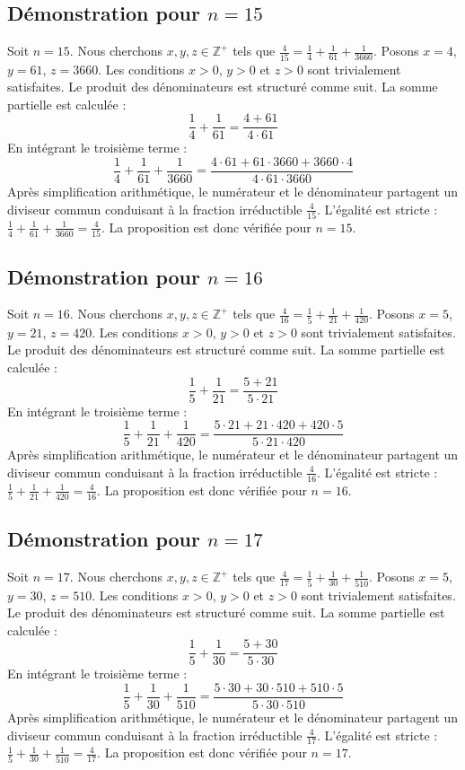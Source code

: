 \documentclass[11pt,a4paper]{article}
\begin{document}
\subsection{Démonstration pour $n = 15$}
Soit $n = 15$. Nous cherchons $x, y, z \in \mathbb{Z}^{+}$ tels que $\frac{4}{15} = \frac{1}{4} + \frac{1}{61} + \frac{1}{3660}$.
Posons $x = 4$, $y = 61$, $z = 3660$.
Les conditions $x > 0$, $y > 0$ et $z > 0$ sont trivialement satisfaites.
Le produit des dénominateurs est structuré comme suit. La somme partielle est calculée :
$$ \frac{1}{4} + \frac{1}{61} = \frac{4+61}{4 \cdot 61} $$
En intégrant le troisième terme :
$$ \frac{1}{4} + \frac{1}{61} + \frac{1}{3660} = \frac{4 \cdot 61 + 61 \cdot 3660 + 3660 \cdot 4}{4 \cdot 61 \cdot 3660} $$
Après simplification arithmétique, le numérateur et le dénominateur partagent un diviseur commun conduisant à la fraction irréductible $\frac{4}{15}$.
L'égalité est stricte : $\frac{1}{4} + \frac{1}{61} + \frac{1}{3660} = \frac{4}{15}$.
La proposition est donc vérifiée pour $n = 15$.
\subsection{Démonstration pour $n = 16$}
Soit $n = 16$. Nous cherchons $x, y, z \in \mathbb{Z}^{+}$ tels que $\frac{4}{16} = \frac{1}{5} + \frac{1}{21} + \frac{1}{420}$.
Posons $x = 5$, $y = 21$, $z = 420$.
Les conditions $x > 0$, $y > 0$ et $z > 0$ sont trivialement satisfaites.
Le produit des dénominateurs est structuré comme suit. La somme partielle est calculée :
$$ \frac{1}{5} + \frac{1}{21} = \frac{5+21}{5 \cdot 21} $$
En intégrant le troisième terme :
$$ \frac{1}{5} + \frac{1}{21} + \frac{1}{420} = \frac{5 \cdot 21 + 21 \cdot 420 + 420 \cdot 5}{5 \cdot 21 \cdot 420} $$
Après simplification arithmétique, le numérateur et le dénominateur partagent un diviseur commun conduisant à la fraction irréductible $\frac{4}{16}$.
L'égalité est stricte : $\frac{1}{5} + \frac{1}{21} + \frac{1}{420} = \frac{4}{16}$.
La proposition est donc vérifiée pour $n = 16$.
\subsection{Démonstration pour $n = 17$}
Soit $n = 17$. Nous cherchons $x, y, z \in \mathbb{Z}^{+}$ tels que $\frac{4}{17} = \frac{1}{5} + \frac{1}{30} + \frac{1}{510}$.
Posons $x = 5$, $y = 30$, $z = 510$.
Les conditions $x > 0$, $y > 0$ et $z > 0$ sont trivialement satisfaites.
Le produit des dénominateurs est structuré comme suit. La somme partielle est calculée :
$$ \frac{1}{5} + \frac{1}{30} = \frac{5+30}{5 \cdot 30} $$
En intégrant le troisième terme :
$$ \frac{1}{5} + \frac{1}{30} + \frac{1}{510} = \frac{5 \cdot 30 + 30 \cdot 510 + 510 \cdot 5}{5 \cdot 30 \cdot 510} $$
Après simplification arithmétique, le numérateur et le dénominateur partagent un diviseur commun conduisant à la fraction irréductible $\frac{4}{17}$.
L'égalité est stricte : $\frac{1}{5} + \frac{1}{30} + \frac{1}{510} = \frac{4}{17}$.
La proposition est donc vérifiée pour $n = 17$.
\end{document}

